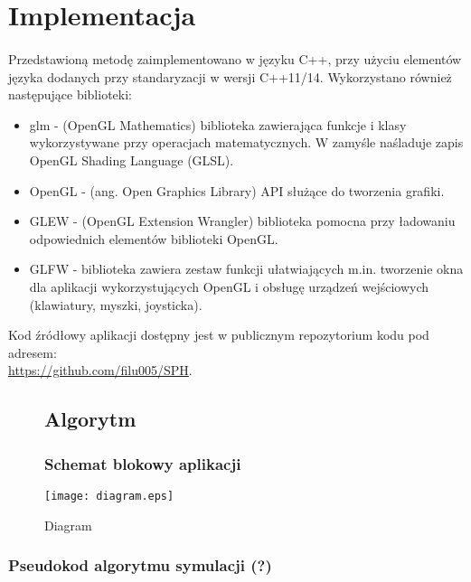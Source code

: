 \newpage

\section{Implementacja}

\paragraph{}
Przedstawioną metodę zaimplementowano w języku C++, przy użyciu elementów języka dodanych przy standaryzacji w wersji C++11/14. Wykorzystano również następujące biblioteki:
\begin{itemize}
	\item glm - (OpenGL Mathematics) biblioteka zawierająca funkcje i klasy wykorzystywane przy operacjach matematycznych. W zamyśle naśladuje zapis OpenGL Shading Language (GLSL).
	\item OpenGL - (ang. Open Graphics Library) API służące do tworzenia grafiki.
	\item GLEW - (OpenGL Extension Wrangler) biblioteka pomocna przy ładowaniu odpowiednich elementów biblioteki OpenGL.
	\item GLFW - biblioteka zawiera zestaw funkcji ułatwiających m.in. tworzenie okna dla aplikacji wykorzystujących OpenGL i obsługę urządzeń wejściowych (klawiatury, myszki, joysticka).
\end{itemize}
Kod źródłowy aplikacji dostępny jest w publicznym repozytorium kodu pod adresem:\\ \href{https://github.com/filu005/SPH}{https://github.com/filu005/SPH}.
\par


\begin{figure}
\subsection{Algorytm}
\subsubsection{Schemat blokowy aplikacji}

\centering
\caption{Diagram}
\texttt{[image: diagram.eps]}%
\label{fig:diagram_main}
\newpage
\end{figure}
\newpage

\subsubsection{Pseudokod algorytmu symulacji (?)}

